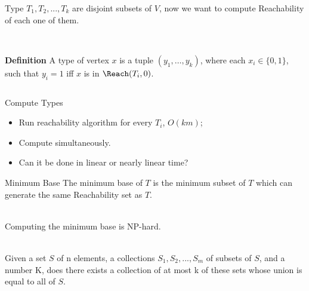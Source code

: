 \begin{frame}{Type}
    $T_1,T_2,...,T_k$ are disjoint subsets of $V$, now we want to compute Reachability of each one of them.\\~\\


    \begin{columns}
    \begin{adjustbox}{width=\textwidth}
    \end{adjustbox}

        \textbf{Definition} A type of vertex $x$ is a tuple $(y_1, \ldots, y_k)$, where each $x_i \in \{0,1\}$, such that $y_i=1$ iff $x$ is in $\Reach (T_i, 0)$.
    \end{columns}
\end{frame}
\begin{frame}{Compute Types}
    \begin{itemize}
        \item Run reachability algorithm for every $T_i$, $O(km)$;
        \item Compute simultaneously.
        \item Can it be done in linear or nearly linear time?
    \end{itemize}
\end{frame}
\begin{frame}{Minimum Base}
    The minimum base of $T$ is the minimum subset of $T$ which can generate the same Reachability set as $T$.\\~
    
    Computing the minimum base is NP-hard.\\~
    \begin{problem}
        Given a set $S$ of n elements, a collections $S_1,S_2,...,S_m$ of subsets of $S$, and a number K, does there exists a collection of at most k of these sets whose union is equal to all of $S$.
    \end{problem}
    
\end{frame}
